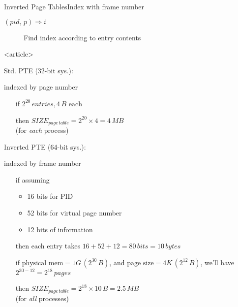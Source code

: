 \begin{frame}{Inverted Page Tables}{Index with frame number}
  \begin{description}
  \item[$(pid,\,p)\Rightarrow{}i$] \quad Find index according to entry contents
  \end{description}
  \centering
\end{frame}

\begin{frame}<article>%
  \begin{minipage}[t]{.39\linewidth}
    Std. PTE (32-bit sys.):
    \begin{center}

      \scriptsize{indexed by page number}
    \end{center}
    \begin{itemize}
    \item[if] $2^{20}\,entries, 4\,B\text{ each}$
    \item[then] $SIZE_{page\,table}=2^{20}\times{}4 = 4\,MB$ \\(for \emph{each} process)
    \end{itemize}
  \end{minipage}
  \hfill
  \begin{minipage}[t]{.58\linewidth}
    Inverted PTE (64-bit sys.):
    \begin{center}

      \scriptsize{indexed by frame number}
    \end{center}
    \begin{itemize}
    \item[if] assuming
      \begin{itemize}
      \item 16 bits for PID
      \item 52 bits for virtual page number
      \item 12 bits of information
      \end{itemize}
    \item[then] each entry takes $16 + 52 + 12 = 80\,bits = 10\,bytes$
    \item[if] $\text{physical mem}=1G\,(2^{30}\,B)$, and $\text{page
        size}=4K\,(2^{12}\,B)$, we'll have $2^{30-12} = 2^{18}\,pages$
    \item[then] $SIZE_{page\,table}=2^{18}\times{}10\,B=2.5\,MB$ \\(for \emph{all}
      processes)
    \end{itemize}
  \end{minipage}
\end{frame}

